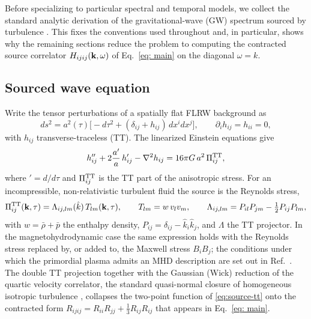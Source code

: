 \documentclass[10pt,prd,aps,nobibnotes,superscriptaddress,preprintnumbers,notitlepage]{revtex4-1}
\def \pa{\partial}
\newcommand{\khat}{\hat{k}}
\newcommand{\kb}{{\bf k}}
\begin{document}
Before specializing to particular spectral and temporal models, we collect the
standard analytic derivation of the gravitational-wave (GW) spectrum sourced by
turbulence \cite{Kosowsky:2001xp,Gogoberidze:2007an,Kahniashvili:2008pe,Caprini:2018mtu,Maggiore:2007}.
This fixes the conventions used throughout and, in particular, shows why the
remaining sections reduce the problem to computing the contracted source
correlator $H_{ijij}(\kb,\omega)$ of Eq.~\eqref{eq: main} on the diagonal
$\omega=k$.

\subsection{Sourced wave equation}
\label{sec:framework-waveeq}

Write the tensor perturbations of a spatially flat FLRW background as
\begin{equation}
  ds^2 = a^2(\tau)\bigl[-d\tau^2 + (\delta_{ij}+h_{ij})\,dx^i dx^j\bigr],
  \qquad \pa_i h_{ij}=h_{ii}=0,
  \label{eq:metric-tt}
\end{equation}
with $h_{ij}$ transverse-traceless (TT). The linearized Einstein equations give
\begin{equation}
  h_{ij}'' + 2\frac{a'}{a}\,h_{ij}' - \nabla^2 h_{ij}
  = 16\pi G\,a^2\,\Pi_{ij}^{\rm TT},
  \label{eq:gw-wave}
\end{equation}
where $' = d/d\tau$ and $\Pi_{ij}^{\rm TT}$ is the TT part of the anisotropic
stress. For an incompressible, non-relativistic turbulent fluid the source is
the Reynolds stress,
\begin{equation}
  \Pi_{ij}^{\rm TT}(\kb,\tau) = \Lambda_{ij,lm}(\khat)\,T_{lm}(\kb,\tau),
  \qquad
  T_{lm} = w\,v_l v_m,
  \qquad
  \Lambda_{ij,lm} = P_{il}P_{jm}-\tfrac12 P_{ij}P_{lm},
  \label{eq:source-tt}
\end{equation}
with $w=\bar\rho+\bar p$ the enthalpy density, $P_{ij}=\delta_{ij}-\khat_i\khat_j$,
and $\Lambda$ the TT projector. In the magnetohydrodynamic case the same
expression holds with the Reynolds stress replaced by, or added to, the Maxwell
stress $B_iB_j$; the conditions under which the primordial plasma admits an MHD
description are set out in Ref.~\cite{Son:1998my}. The double TT projection together with the
Gaussian (Wick) reduction of the quartic velocity correlator, the standard
quasi-normal closure of homogeneous isotropic turbulence
\cite{Batchelor:1953,MoninYaglom:1975,Pope:2000}, collapses the
two-point function of \eqref{eq:source-tt} onto the contracted form
$R_{ijij}=R_{ii}R_{jj}+\tfrac13 R_{ij}R_{ij}$ that appears in Eq.~\eqref{eq: main}.
\end{document}
